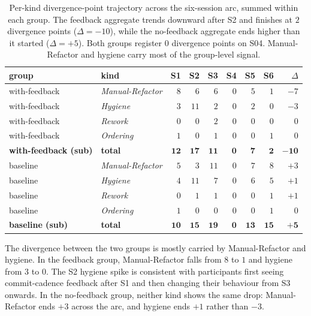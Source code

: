 \begin{table}[htbp]
\centering
\small
\begin{tabular}{llrrrrrrr}
\hline
\textbf{group} & \textbf{kind} & \textbf{S1} & \textbf{S2} & \textbf{S3} & \textbf{S4} & \textbf{S5} & \textbf{S6} & \textbf{$\Delta$} \\
\hline
with-feedback & \emph{Manual-Refactor} & $8$ &  $6$ &  $6$ & $0$ & $5$ & $1$ & $-7$ \\
with-feedback & \emph{Hygiene}    & $3$ & $11$ &  $2$ & $0$ & $2$ & $0$ & $-3$ \\
with-feedback & \emph{Rework}     & $0$ &  $0$ &  $2$ & $0$ & $0$ & $0$ &  $0$ \\
with-feedback & \emph{Ordering}   & $1$ &  $0$ &  $1$ & $0$ & $0$ & $1$ &  $0$ \\
\textbf{with-feedback (sub)} & \textbf{total} & $\mathbf{12}$ & $\mathbf{17}$ & $\mathbf{11}$ & $\mathbf{0}$ & $\mathbf{7}$ & $\mathbf{2}$ & $\mathbf{-10}$ \\
\hline
baseline & \emph{Manual-Refactor} & $5$ &  $3$ & $11$ & $0$ & $7$ & $8$ & $+3$ \\
baseline & \emph{Hygiene}    & $4$ & $11$ &  $7$ & $0$ & $6$ & $5$ & $+1$ \\
baseline & \emph{Rework}     & $0$ &  $1$ &  $1$ & $0$ & $0$ & $1$ & $+1$ \\
baseline & \emph{Ordering}   & $1$ &  $0$ &  $0$ & $0$ & $0$ & $1$ &  $0$ \\
\textbf{baseline (sub)} & \textbf{total} & $\mathbf{10}$ & $\mathbf{15}$ & $\mathbf{19}$ & $\mathbf{0}$ & $\mathbf{13}$ & $\mathbf{15}$ & $\mathbf{+5}$ \\
\hline
\end{tabular}
\caption{Per-kind divergence-point trajectory across the six-session arc, summed within each group. The feedback aggregate trends downward after S2 and finishes at $2$ divergence points ($\Delta = -10$), while the no-feedback aggregate ends higher than it started ($\Delta = +5$). Both groups register $0$ divergence points on S04. Manual-Refactor and hygiene carry most of the group-level signal.}
\label{tab:results-userstudy-trajectory}
\end{table}

The divergence between the two groups is mostly carried by Manual-Refactor and hygiene. In the feedback group, Manual-Refactor falls from $8$ to $1$ and hygiene from $3$ to $0$. The S2 hygiene spike is consistent with participants first seeing commit-cadence feedback after S1 and then changing their behaviour from S3 onwards. In the no-feedback group, neither kind shows the same drop: Manual-Refactor ends $+3$ across the arc, and hygiene ends $+1$ rather than $-3$.

